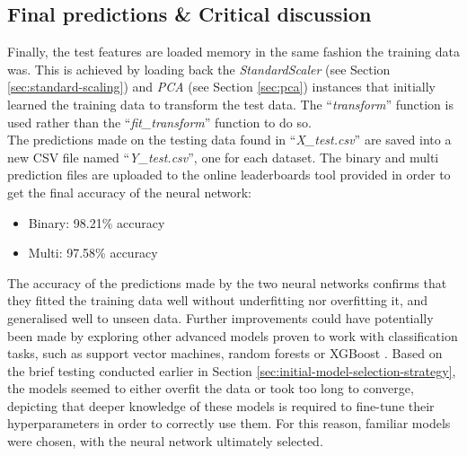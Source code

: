 \documentclass[letterpaper,12pt]{article}
\begin{document}
\subsection{Final predictions \& Critical discussion}

Finally, the test features are loaded memory in the same fashion the training data was. This is achieved by loading back the \textit{StandardScaler} (see Section \ref{sec:standard-scaling}) and \textit{PCA} (see Section \ref{sec:pca}) instances that initially learned the training data to transform the test data. The ``\textit{transform}'' function is used rather than the ``\textit{fit\_transform}'' function to do so.\\

The predictions made on the testing data  found in ``\textit{X\_test.csv}'' are saved into a new  CSV file named ``\textit{Y\_test.csv}'', one for each  dataset. The binary and multi prediction files are uploaded to the online leaderboards tool provided  in order to get the final accuracy of the neural network:
\begin{itemize}
    \item Binary: 98.21\% accuracy
    \item Multi: 97.58\% accuracy
\end{itemize}

The accuracy of the predictions made by the two neural networks confirms that they fitted the training data well without underfitting nor overfitting it, and generalised well to unseen data. Further improvements could have potentially been made by exploring other advanced models proven to work with classification tasks, such as support vector machines, random forests or XGBoost \cite{Geron2019}. Based on the brief testing conducted earlier in Section \ref{sec:initial-model-selection-strategy}, the models seemed to either overfit the data or took too long to converge, depicting that deeper knowledge of these models is required to fine-tune their hyperparameters in order to correctly use them. For this reason, familiar models were chosen, with the neural network ultimately selected.


\end{document}
